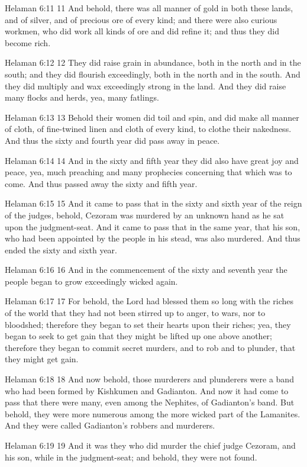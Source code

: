 Helaman 6:11
 11 And behold, there was all manner of gold in both these lands,
and of silver, and of precious ore of every kind; and there were
also curious workmen, who did work all kinds of ore and did
refine it; and thus they did become rich.

Helaman 6:12
 12 They did raise grain in abundance, both in the north and in
the south; and they did flourish exceedingly, both in the north
and in the south. And they did multiply and wax exceedingly
strong in the land. And they did raise many flocks and herds,
yea, many fatlings.

Helaman 6:13
 13 Behold their women did toil and spin, and did make all manner
of cloth, of fine-twined linen and cloth of every kind, to clothe
their nakedness. And thus the sixty and fourth year did pass
away in peace.

Helaman 6:14
 14 And in the sixty and fifth year they did also have great joy
and peace, yea, much preaching and many prophecies concerning
that which was to come. And thus passed away the sixty and fifth
year.

Helaman 6:15
 15 And it came to pass that in the sixty and sixth year of the
reign of the judges, behold, Cezoram was murdered by an unknown
hand as he sat upon the judgment-seat. And it came to pass that
in the same year, that his son, who had been appointed by the
people in his stead, was also murdered. And thus ended the sixty
and sixth year.

Helaman 6:16
 16 And in the commencement of the sixty and seventh year the
people began to grow exceedingly wicked again.

Helaman 6:17
 17 For behold, the Lord had blessed them so long with the riches
of the world that they had not been stirred up to anger, to wars,
nor to bloodshed; therefore they began to set their hearts upon
their riches; yea, they began to seek to get gain that they might
be lifted up one above another; therefore they began to commit
secret murders, and to rob and to plunder, that they might get
gain.

Helaman 6:18
 18 And now behold, those murderers and plunderers were a band
who had been formed by Kishkumen and Gadianton. And now it had
come to pass that there were many, even among the Nephites, of
Gadianton's band. But behold, they were more numerous among the
more wicked part of the Lamanites. And they were called
Gadianton's robbers and murderers.

Helaman 6:19
 19 And it was they who did murder the chief judge Cezoram, and
his son, while in the judgment-seat; and behold, they were not
found.

